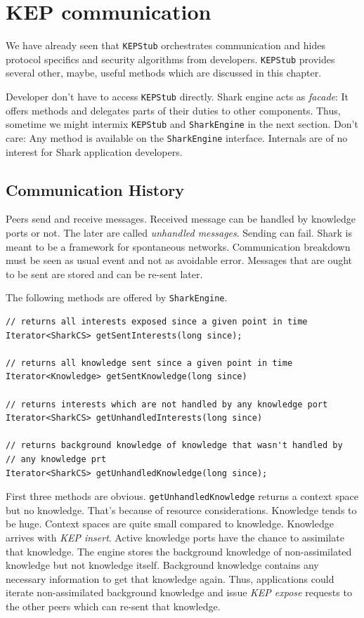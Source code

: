 \section{KEP communication}
\label{ref:sec:KEP}
We have already seen that {\tt KEPStub} orchestrates communication and hides protocol specifics and security algorithms from developers. {\tt KEPStub} provides several other, maybe, useful methods which are discussed in this chapter. 

Developer don't have to access {\tt KEPStub} directly. Shark engine acts as {\it facade}: It offers methods and delegates parts of their duties to other components. Thus, sometime we might intermix {\tt KEPStub} and {\tt SharkEngine} in the next section. Don't care: Any method is available on the {\tt SharkEngine} interface. Internals are of no interest for Shark application developers.

\subsection{Communication History}
Peers send and receive messages. Received message can be handled by knowledge ports or not. The later are called {\it unhandled messages}. Sending can fail. Shark is meant to be a framework for spontaneous networks. Communication breakdown must be seen as usual event and not as avoidable error. Messages that are ought to be sent are stored and can be re-sent later.

The following methods are offered by {\tt SharkEngine}.

\begin{verbatim}
// returns all interests exposed since a given point in time
Iterator<SharkCS> getSentInterests(long since);

// returns all knowledge sent since a given point in time
Iterator<Knowledge> getSentKnowledge(long since)
  
// returns interests which are not handled by any knowledge port
Iterator<SharkCS> getUnhandledInterests(long since)

// returns background knowledge of knowledge that wasn't handled by
// any knowledge prt
Iterator<SharkCS> getUnhandledKnowledge(long since);
\end{verbatim}

First three methods are obvious. {\tt getUnhandledKnowledge} returns a context space but no knowledge. That's because of resource considerations. Knowledge tends to be huge. Context spaces are quite small compared to knowledge. Knowledge arrives with {\it KEP insert}. Active knowledge ports have the chance to assimilate that knowledge. The engine stores the background knowledge of non-assimilated knowledge but not knowledge itself. Background knowledge contains any necessary information to get that knowledge again. Thus, applications could iterate non-assimilated background knowledge and issue {\it KEP expose} requests to the other peers which can re-sent that knowledge.

